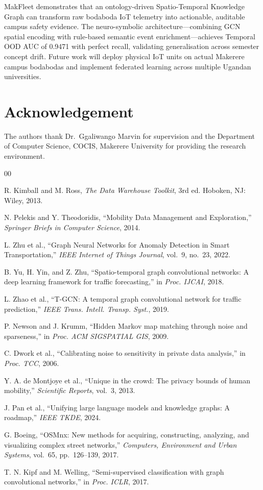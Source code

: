 \documentclass[conference]{IEEEtran}
\begin{document}
MakFleet demonstrates that an ontology-driven Spatio-Temporal
Knowledge Graph can transform raw bodaboda IoT telemetry into
actionable, auditable campus safety evidence. The neuro-symbolic
architecture---combining GCN spatial encoding with rule-based
semantic event enrichment---achieves Temporal OOD AUC of 0.9471
with perfect recall, validating generalisation across semester
concept drift. Future work will deploy physical IoT units on actual
Makerere campus bodabodas and implement federated learning across
multiple Ugandan universities.


\section*{Acknowledgement}

The authors thank Dr.\ Ggaliwango Marvin for supervision and the
Department of Computer Science, COCIS, Makerere University for
providing the research environment.


\begin{thebibliography}{00}

R. Kimball and M. Ross, \textit{The Data Warehouse Toolkit}, 3rd ed.
Hoboken, NJ: Wiley, 2013.

N. Pelekis and Y. Theodoridis, ``Mobility Data Management and
Exploration,'' \textit{Springer Briefs in Computer Science}, 2014.

L. Zhu et al., ``Graph Neural Networks for Anomaly Detection in
Smart Transportation,'' \textit{IEEE Internet of Things Journal},
vol.~9, no.~23, 2022.

B. Yu, H. Yin, and Z. Zhu, ``Spatio-temporal graph convolutional
networks: A deep learning framework for traffic forecasting,''
in \textit{Proc. IJCAI}, 2018.

L. Zhao et al., ``T-GCN: A temporal graph convolutional network for
traffic prediction,'' \textit{IEEE Trans. Intell. Transp. Syst.},
2019.

P. Newson and J. Krumm, ``Hidden Markov map matching through noise
and sparseness,'' in \textit{Proc. ACM SIGSPATIAL GIS}, 2009.

C. Dwork et al., ``Calibrating noise to sensitivity in private data
analysis,'' in \textit{Proc. TCC}, 2006.

Y. A. de Montjoye et al., ``Unique in the crowd: The privacy bounds
of human mobility,'' \textit{Scientific Reports}, vol.~3, 2013.

J. Pan et al., ``Unifying large language models and knowledge
graphs: A roadmap,'' \textit{IEEE TKDE}, 2024.

G. Boeing, ``OSMnx: New methods for acquiring, constructing,
analyzing, and visualizing complex street networks,''
\textit{Computers, Environment and Urban Systems}, vol.~65,
pp.~126--139, 2017.

T. N. Kipf and M. Welling, ``Semi-supervised classification with
graph convolutional networks,'' in \textit{Proc. ICLR}, 2017.

\end{thebibliography}
\end{document}
